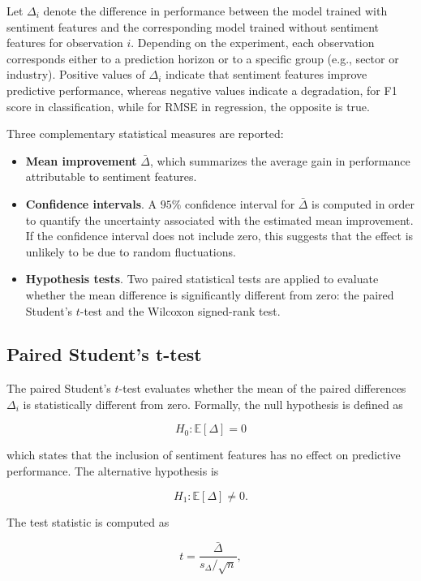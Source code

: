 Let $\Delta_i$ denote the difference in performance between the model trained with sentiment features and the corresponding model trained without sentiment features for observation $i$. 
Depending on the experiment, each observation corresponds either to a prediction horizon or to a specific group (e.g., sector or industry). 
Positive values of $\Delta_i$ indicate that sentiment features improve predictive performance, whereas negative values indicate a degradation, for F1 score in classification, while for RMSE in regression, the opposite is true.

Three complementary statistical measures are reported:

\begin{itemize}
    \item \textbf{Mean improvement} $\bar{\Delta}$, which summarizes the average gain in performance attributable to sentiment features.
    
    \item \textbf{Confidence intervals}. A $95\%$ confidence interval for $\bar{\Delta}$ is computed in order to quantify the uncertainty associated with the estimated mean improvement. If the confidence interval does not include zero, this suggests that the effect is unlikely to be due to random fluctuations.
    
    \item \textbf{Hypothesis tests}. Two paired statistical tests are applied to evaluate whether the mean difference is significantly different from zero: the paired Student's $t$-test and the Wilcoxon signed-rank test.
\end{itemize}

\subsection{Paired Student's t-test}

The paired Student's $t$-test evaluates whether the mean of the paired differences $\Delta_i$ is statistically different from zero. Formally, the null hypothesis is defined as

\[
H_0 : \mathbb{E}[\Delta] = 0
\]

which states that the inclusion of sentiment features has no effect on predictive performance. The alternative hypothesis is

\[
H_1 : \mathbb{E}[\Delta] \neq 0 .
\]

The test statistic is computed as

\[
t = \frac{\bar{\Delta}}{s_\Delta / \sqrt{n}},
\]

